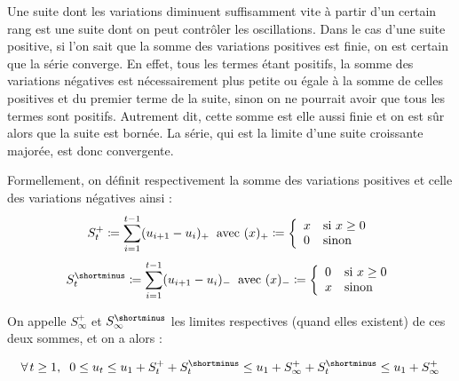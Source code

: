 \documentclass{article}
\begin{document}
Une suite dont les variations diminuent suffisamment vite à partir d'un certain rang est une suite dont on
peut contrôler les oscillations.
Dans le cas d'une suite positive, si l'on sait que la somme des variations positives est finie, on est certain que la série converge. En effet, tous les termes étant positifs, la somme des variations négatives est nécessairement plus petite ou égale à la somme de celles positives et du premier terme de la suite, sinon on ne pourrait avoir que tous les termes sont positifs. Autrement dit, cette somme est elle aussi finie et on est sûr alors que la suite est bornée. La série, qui est la limite d'une suite croissante majorée, est donc convergente.
\bigskip 

Formellement, on définit respectivement la somme des variations positives et celle des variations négatives ainsi :
\begin{equation*} %
    S_{t}^{+} \coloneqq \sum_{i=1}^{t-1} (u_{i+1} - u_i)_+ \hspace{0.2cm}\text{avec }(x)_+\coloneqq 
    \left\{
        \begin{array}{ll}
         x & \text{si } x \geq 0 \\
         0 & \text{sinon} 
        \end{array}
    \right.
\end{equation*}
\begin{equation*} %
    S_{t}^{\shortminus} \coloneqq \sum_{i=1}^{t-1} (u_{i+1} - u_i)_- \hspace{0.2cm}\text{avec }(x)_-\coloneqq 
    \left\{
        \begin{array}{ll}
         0 & \text{si } x \geq 0 \\
         x & \text{sinon} 
        \end{array}
    \right.
\end{equation*}
\bigskip %

On appelle $S_{\infty}^{+}$ et $S_{\infty}^{\shortminus}$ les limites respectives (quand elles existent) de ces deux sommes, et on a alors :

\begin{equation*}
    \forall \hspace{0.05cm} t \geq 1, \hspace{0.2cm} 0 \leq u_t \leq u_1 + S_{t}^{+} + S_{t}^{\shortminus} \leq u_1 + S_{\infty}^{+} + S_{t}^{\shortminus} \leq u_1 + S_{\infty}^{+}
\end{equation*}
\end{document}
